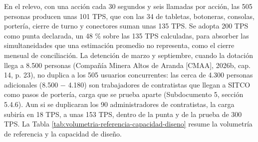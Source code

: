 \documentclass[subdoc]{../../comun/overfore}
\begin{document}
En el relevo, con una acción cada 30 segundos y seis llamadas por acción, las 505 personas producen unas 101 TPS, que con las 34 de tabletas, botoneras, consolas, portería, cierre de turno y conectores suman unas 135 TPS. Se adopta 200 TPS como punta declarada, un 48 \% sobre las 135 TPS calculadas, para absorber las simultaneidades que una estimación promedio no representa, como el cierre mensual de conciliación. La detención de marzo y septiembre, cuando la dotación llega a 8.500 personas (Compañía Minera Altos de Aranda [CMAA], 2026b, cap. 14, p. 23), no duplica a los 505 usuarios concurrentes: las cerca de 4.300 personas adicionales (8.500 − 4.180) son trabajadores de contratistas que llegan a SITCO como pasos de portería, carga que se prueba aparte (Subdocumento 5, sección 5.4.6). Aun si se duplicaran los 90 administradores de contratistas, la carga subiría en 18 TPS, a unas 153 TPS, dentro de la punta y de la prueba de 300 TPS. La Tabla \ref{tab:volumetria-referencia-capacidad-diseno} resume la volumetría de referencia y la capacidad de diseño.
\end{document}
